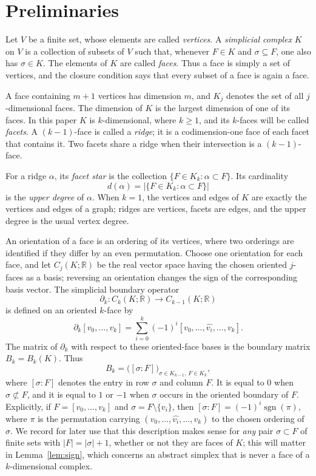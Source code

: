 \documentclass[11pt,reqno]{amsart}
\numberwithin{equation}{section}
\theoremstyle{plain}
\theoremstyle{definition}
\newcommand{\R}{\mathbb{R}}
\DeclareMathOperator{\sgn}{sgn}
\begin{document}
\section{Preliminaries}



Let $V$ be a finite set, whose elements are called \emph{vertices}. A \emph{simplicial
complex} $K$ on $V$ is a collection of subsets of $V$ such that, whenever $F\in K$ and
$\sigma\subseteq F$, one also has $\sigma\in K$. The elements of $K$ are called \emph{faces}.
Thus a face is simply a set of vertices, and the closure condition says that every subset of a
face is again a face.

A face containing $m+1$ vertices has dimension $m$, and $K_j$ denotes the set of all
$j$-dimensional faces. The dimension of $K$ is the largest dimension of one of its faces. In
this paper $K$ is $k$-dimensional, where $k\ge1$, and its $k$-faces will be called
\emph{facets}. A
$(k-1)$-face is called a \emph{ridge}; it is a codimension-one face of each facet that contains
it. Two facets share a ridge when their intersection is a $(k-1)$-face.

For a ridge $\alpha$, its \emph{facet star} is the collection
$\{F\in K_k:\alpha\subset F\}$. Its cardinality
\[
  d(\alpha)=\bigl|\{F\in K_k:\alpha\subset F\}\bigr|
\]
is the \emph{upper degree} of $\alpha$. When $k=1$, the vertices and edges of $K$ are exactly
the vertices and edges of a graph; ridges are vertices, facets are edges, and the upper degree
is the usual vertex degree.

An orientation of a face is an ordering of its vertices, where two orderings are identified if
they differ by an even permutation. Choose one orientation for each face, and let
$C_j(K;\R)$ be the real vector space having the chosen oriented $j$-faces as a basis; reversing
an orientation changes the sign of the corresponding basis vector. The simplicial boundary operator
\[
  \partial_k:C_k(K;\R)\longrightarrow C_{k-1}(K;\R)
\]
is defined on an oriented $k$-face by
\[
  \partial_k[v_0,\dots,v_k]
  =\sum_{i=0}^{k}{(-1)}^{i}[v_0,\dots,\widehat{v_i},\dots,v_k] .
\]
The matrix of $\partial_k$ with respect to these oriented-face bases is the boundary matrix
$B_k=B_k(K)$. Thus
\[
  B_k={\bigl([\sigma:F]\bigr)}_{\sigma\in K_{k-1},\,F\in K_k},
\]
where $[\sigma:F]$ denotes the entry in row $\sigma$ and column $F$. It is equal to $0$ when
$\sigma\not\subset F$, and it is
equal to $1$ or $-1$ when $\sigma$ occurs in the oriented boundary of $F$. Explicitly, if
$F=[v_0,\dots,v_k]$ and $\sigma=F\setminus\{v_i\}$, then $[\sigma:F]={(-1)}^{i}\sgn(\pi)$, where
$\pi$ is the permutation carrying $(v_0,\dots,\widehat{v_i},\dots,v_k)$ to the chosen ordering
of $\sigma$. We record for later use that this description makes sense for \emph{any} pair
$\sigma\subset F$ of finite sets with $|F|=|\sigma|+1$, whether or not they are faces of $K$;
this will matter in Lemma~\ref{lem:sign}, which concerns an abstract simplex that is never a
face of a $k$-dimensional complex.
\end{document}
